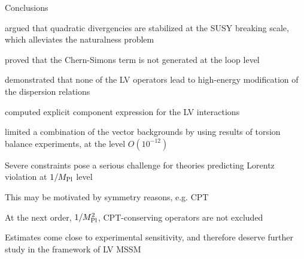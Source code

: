 \documentclass[pdf,PItalk,slideColor,colorBG,accumulate]{prosper}
\newcommand{\myit}{\usefont{T1}{ppl}{m}{it}\fontsize{8pt}{6pt}\selectfont}
\begin{document}

{
\begin{slide}{ Conclusions }
{
}

\onlyInPS{
\vspace{-1.0cm}
}

\begin{itemstep}
\item argued that quadratic divergencies are stabilized at the
	SUSY breaking scale, which alleviates the naturalness problem
\item proved that the Chern-Simons term is not generated at the loop
	level
\item demonstrated that none of the LV operators lead to high-energy
	modification of the dispersion relations
\item computed explicit component expression for the LV interactions
\item limited a combination of the vector backgrounds by using
	results of torsion balance experiments, at the level 
	$ O(10^{-12}) $
\end{itemstep}	
\dgreen
{}
	Severe constraints pose a serious challenge for theories
	predicting Lorentz violation at $ 1/M_{\rm Pl} $ level

	This may be motivated by symmetry reasons, {\myit e.g.} CPT

	At the next order,  $ 1/M_{\rm Pl}^2 $, CPT-conserving operators
	are not excluded


	Estimates come close to experimental sensitivity, and therefore
	deserve further study in the framework of LV MSSM

\end{slide}
}
\end{document}
